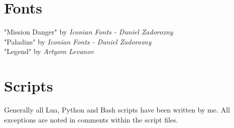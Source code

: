 \section*{Fonts}
"Mission Danger" by \textit{Iconian Fonts - Daniel Zadorozny}\\
"Paladins" by \textit{Iconian Fonts - Daniel Zadorozny}\\
"Legend" by \textit{Artyom Levanov}

\section*{Scripts}
Generally all Lua, Python and Bash scripts have been written by me. All exceptions are noted in comments within the script files.